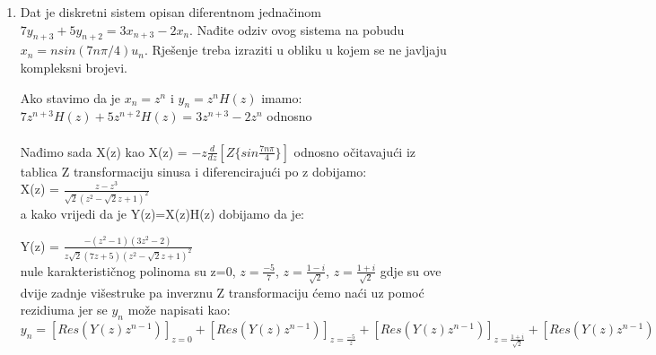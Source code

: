 \documentclass[12pt]{article}
\begin{document}
\begin{enumerate}
\begin{center}
	\end{center}
	\item Dat je diskretni sistem opisan diferentnom jednačinom $7y_{n+3} + 5 y_{n+2} = 3 x_{n+3}-2x_n$. Nađite odziv ovog sistema na pobudu $x_n = n sin (7n \pi / 4) u_n$. Rješenje treba izraziti u obliku u kojem se ne javljaju kompleksni brojevi.\\
	\begin{center}
	   
	    Ako stavimo da je $x_n = z^n$ i $y_n = z^nH(z)$ imamo:\\
	    $7z^{n+3}H(z) + 5z^{n+2}H(z) = 3z^{n+3} -2z^n$ odnosno \\
	    \vspace{0.3cm}
	   \\
	   
	   Nađimo sada X(z) kao X(z) = $-z\frac{d}{dz}[Z\{sin\frac{7n\pi}{4}\}]$ odnosno očitavajući iz tablica Z transformaciju sinusa i diferencirajući po z dobijamo: \\
	   \vspace{0.3cm}
	   X(z) = $\frac{z-z^3}{\sqrt{2}(z^2-\sqrt{2}z+1)^2}$\\
	   a kako vrijedi da je Y(z)=X(z)H(z) dobijamo da je: \\
	   \vspace{0.3cm}
	   
	   Y(z) = $\frac{-(z^2-1)(3z^2-2)}{z\sqrt{2}(7z+5)(z^2-\sqrt{2}z+1)^2}$
	   \\
	   nule karakterističnog polinoma su z=0, $z=\frac{-5}{7}$, $z=\frac{1-i}{\sqrt{2}}$,  $z=\frac{1+i}{\sqrt{2}}$ gdje su ove dvije zadnje višestruke pa inverznu Z transformaciju ćemo naći uz pomoć rezidiuma jer se 
	   $y_n$ može napisati kao: \\
	   \vspace{0.3cm}
	   $y_n =[Res(Y(z)z^{n-1})]_{z=0} + [Res(Y(z)z^{n-1})]_{z=\frac{-5}{z}} 
	   + [Res(Y(z)z^{n-1})]_{z=\frac{1+i}{\sqrt{2}}} + [Res(Y(z)z^{n-1})]_{z=\frac{1-i}{\sqrt{2}}}$ \\
 

\end{center}
\end{enumerate}
\end{document}
